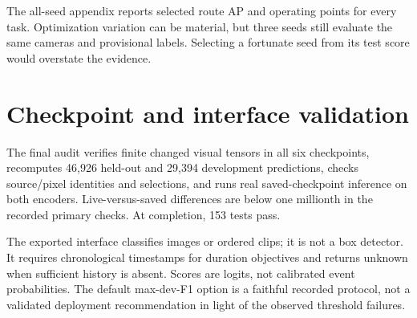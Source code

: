 The all-seed appendix reports selected route AP and operating points for every task. Optimization variation can be material, but three seeds still evaluate the same cameras and provisional labels. Selecting a fortunate seed from its test score would overstate the evidence.

\section{Checkpoint and interface validation}
The final audit verifies finite changed visual tensors in all six checkpoints, recomputes 46,926 held-out and 29,394 development predictions, checks source/pixel identities and selections, and runs real saved-checkpoint inference on both encoders. Live-versus-saved differences are below one millionth in the recorded primary checks. At completion, 153 tests pass.

The exported interface classifies images or ordered clips; it is not a box detector. It requires chronological timestamps for duration objectives and returns unknown when sufficient history is absent. Scores are logits, not calibrated event probabilities. The default max-dev-F1 option is a faithful recorded protocol, not a validated deployment recommendation in light of the observed threshold failures.
